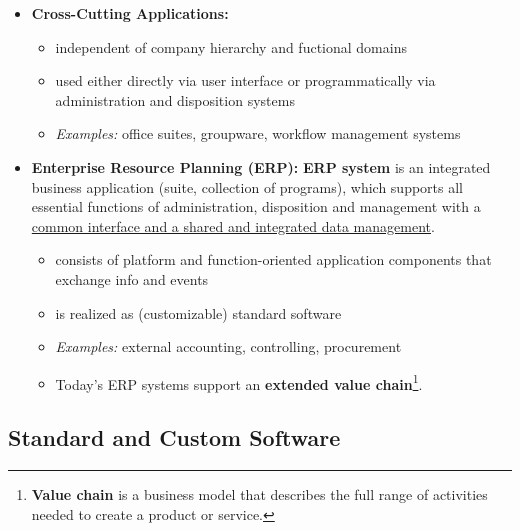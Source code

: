 \documentclass[ieeetran]{article}
\begin{document}
\begin{itemize}
\begin{itemize}
\end{itemize}
\item \textbf{Cross-Cutting Applications:}
	\begin{itemize}
	  \item independent of company hierarchy and fuctional domains
	\item used either directly via user interface or programmatically via administration and disposition systems
	\item \textit{Examples:} office suites, groupware, workflow management systems
	\end{itemize}

\item \textbf{Enterprise Resource Planning (ERP):} \textbf{ERP system} is an integrated business application (suite, collection of programs), which supports all essential functions of administration, disposition and management with a \underline{common interface and a shared and integrated data management}.
	\begin{itemize}
	  \item consists of platform and function-oriented application components that exchange info and events
          \item is realized as (customizable) standard software
	\item \textit{Examples:} external accounting, controlling, procurement
	\item Today's ERP systems support an \textbf{extended value chain}\footnote{\textbf{Value chain} is a business model that describes the full range of activities needed to create a product or service.}.
	\end{itemize}
\end{itemize}

\subsection{Standard and Custom Software} %
\label{sub:standard_and_custom_software}
\end{document}
